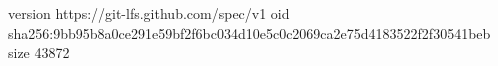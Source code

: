 version https://git-lfs.github.com/spec/v1
oid sha256:9bb95b8a0ce291e59bf2f6bc034d10e5c0c2069ca2e75d4183522f2f30541beb
size 43872

